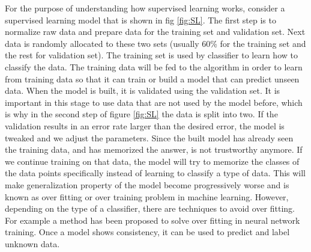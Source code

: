 For the purpose of understanding how supervised learning works, consider a supervised learning model that is shown in fig \ref{fig:SL}. The first step is to normalize raw data and prepare data for the training set and validation set. Next data is randomly allocated to these two sets (usually $60$\% for the training set and the rest for validation set). The training set is used by classifier to learn how to classify the data. The training data will be fed to the algorithm in order to learn from training data so that it can train or build a model that can predict unseen data. When the model is built, it is validated using the validation set. It is important in this stage to use data that are not used by the model before, which is why in the second step of figure \ref{fig:SL} the data is split into two. If the validation results in an error rate larger than the desired error, the model is tweaked and we adjust the parameters. Since the built model has already seen the training data, and has memorized the answer, is not trustworthy anymore. If we continue training on that data, the model will try to memorize the classes of the data points specifically instead of learning to classify a type of data. This will make generalization property of the model become progressively worse and is known as over fitting or over training \cite{hawkins2004problem} problem in machine learning. However, depending on the type of a classifier, there are techniques to avoid over fitting. For example a method \cite{Piotrowski201397} has been proposed to solve over fitting in neural network training. Once a model shows consistency, it can be used to predict and label unknown data. \\  
 








